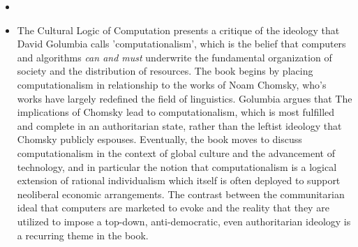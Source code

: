 \documentclass{article} \usepackage{filecontents}
\begin{document}
\begin{itemize}
\item \cite{golumbia2009CulturalLogic}
\item The Cultural Logic of Computation presents a critique of the
  ideology that David Golumbia calls 'computationalism', which is the
  belief that computers and algorithms \emph{can and must} underwrite
  the fundamental organization of society and the distribution of
  resources. The book begins by placing computationalism in
  relationship to the works of Noam Chomsky, who's works have largely
  redefined the field of linguistics. Golumbia argues that The
  implications of Chomsky lead to computationalism, which is most
  fulfilled and complete in an authoritarian state, rather than the
  leftist ideology that Chomsky publicly espouses. Eventually, the
  book moves to discuss computationalism in the context of global
  culture and the advancement of technology, and in particular the
  notion that computationalism is a logical extension of rational
  individualism which itself is often deployed to support neoliberal
  economic arrangements. The contrast between the communitarian ideal
  that computers are marketed to evoke and the reality that they are
  utilized to impose a top-down, anti-democratic, even authoritarian
  ideology is a recurring theme in the book.

\end{itemize}
\end{document}
